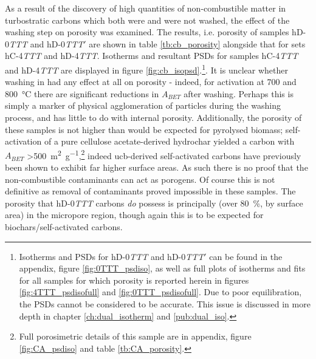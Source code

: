As a result of the discovery of high quantities of non-combustible matter in turbostratic carbons which both were and were not washed, the effect of the washing step on porosity was examined. The results, i.e. porosity of samples hD-0\textit{TTT} and hD-0\textit{TTT}$'$ are shown in table \ref{tb:cb_porosity} alongside that for sets hC-4\textit{TTT} and hD-4\textit{TTT}. Isotherms and resultant PSDs for samples hC-4\textit{TTT} and hD-4\textit{TTT} are displayed in figure \ref{fig:cb_isopsd}.\footnote{Isotherms and PSDs for hD-0\textit{TTT} and hD-0\textit{TTT}$'$ can be found in the appendix, figure \ref{fig:0TTT_psdiso}, as well as full plots of isotherms and fits for all samples for which porosity is reported herein in figures \ref{fig:4TTT_psdisofull} and \ref{fig:0TTT_psdisofull}. Due to poor equilibration, the PSDs cannot be considered to be accurate. This issue is discussed in more depth in chapter \ref{ch:dual_isotherm} and \ref{pub:dual_iso}.}.  It is unclear whether washing in  had any effect at all on porosity - indeed, for activation at 700 and \qty{800}{\degreeCelsius} there are significant reductions in $A_{BET}$ after washing. Perhaps this is simply a marker of physical agglomeration of particles during the washing process, and has little to do with internal porosity. Additionally, the porosity of these samples is not higher than would be expected for pyrolysed biomass; \gls{self-activation} of a pure cellulose acetate-derived \gls{hydrochar} yielded a carbon with $A_{BET}$  \qty{>500}{\metre\squared\per\gram},\footnote{Full porosimetric details of this sample are in appendix, figure \ref{fig:CA_psdiso} and table \ref{tb:CA_porosity}.} indeed \acrshort{ucb}-derived self-activated carbons have previously been shown to exhibit far higher surface areas.\citep{Soltani2013, Yazdi2012, Lee2014, Yu2018, Koochaki2019} As such there is no proof that the non-combustible contaminants can act as \glspl{porogen}. Of course this is not definitive as removal of contaminants proved impossible in these samples. The porosity that hD-0\textit{TTT} carbons \textit{do} possess is principally (over \qty{80}{\percent}, by surface area) in the \gls{micropore} region, though again this is to be expected for \glspl{biochar}/self-activated carbons.\citep{Weber2018Properties, Jagiello2019Enhanced, suliman2017role}


